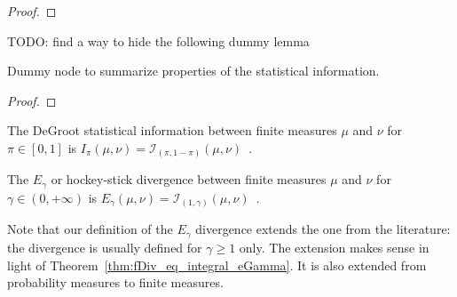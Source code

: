 \begin{proof}%
{}

\end{proof}


TODO: find a way to hide the following dummy lemma
\begin{lemma}
  \label{lem:statInfo_properties}
  \leanok
  Dummy node to summarize properties of the statistical information.
\end{lemma}

\begin{proof}\leanok
{}
\end{proof}


\begin{definition}
  \label{def:deGrootInfo}
  \leanok
  The DeGroot statistical information between finite measures $\mu$ and $\nu$ for $\pi \in [0,1]$ is $I_\pi (\mu, \nu) = \mathcal I_{(\pi, 1 - \pi)}(\mu, \nu)$~.
\end{definition}


\begin{definition}
  \label{def:eGamma}
  \leanok
  The $E_\gamma$ or hockey-stick divergence between finite measures $\mu$ and $\nu$ for $\gamma \in (0,+\infty)$ is $E_\gamma(\mu, \nu) = \mathcal I_{(1,\gamma)}(\mu, \nu)$~.
\end{definition}

Note that our definition of the $E_\gamma$ divergence extends the one from the literature: the divergence is usually defined for $\gamma \ge 1$ only.
The extension makes sense in light of Theorem~\ref{thm:fDiv_eq_integral_eGamma}.
It is also extended from probability measures to finite measures.


%
%

